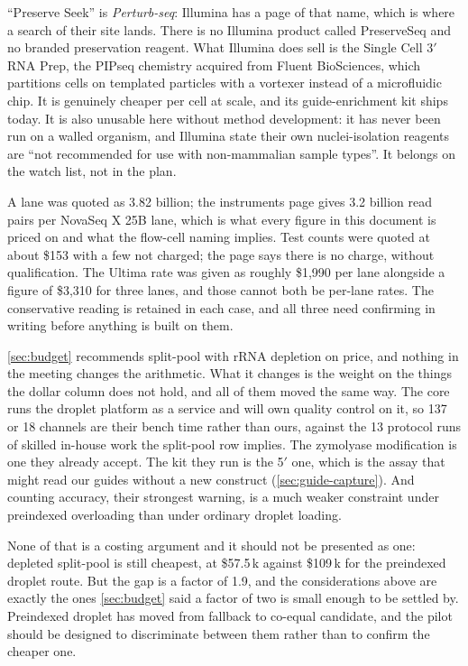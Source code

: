  ``Preserve Seek'' is
\emph{Perturb-seq}: Illumina has a page of that name, which is where a search of
their site lands. There is no Illumina product called PreserveSeq and no branded
preservation reagent. What Illumina does sell is the Single Cell 3$'$ RNA Prep,
the PIPseq chemistry acquired from Fluent BioSciences, which partitions cells on
templated particles with a vortexer instead of a microfluidic chip. It is
genuinely cheaper per cell at scale, and its guide-enrichment kit ships today.
It is also unusable here without method development: it has never been run on a
walled organism, and Illumina state their own nuclei-isolation reagents are
``not recommended for use with non-mammalian sample types''. It belongs on the watch list, not in the plan.

 A lane was
quoted as 3.82 billion; the instruments page gives 3.2 billion read pairs per
NovaSeq X 25B lane, which is what every figure in this document is priced on and
what the flow-cell naming implies. Test counts were quoted at about \$153 with a
few not charged; the page says there is no charge, without qualification. The
Ultima rate was given as roughly \$1{,}990 per lane alongside a figure of
\$3{,}310 for three lanes, and those cannot both be per-lane rates. The
conservative reading is retained in each case, and all three need confirming in
writing before anything is built on them.

 \cref{sec:budget} recommends
split-pool with rRNA depletion on price, and nothing in the meeting changes the
arithmetic. What it changes is the weight on the things the dollar column does
not hold, and all of them moved the same way. The core runs the droplet platform
as a service and will own quality control on it, so 137 or 18 channels are their
bench time rather than ours, against the 13 protocol runs of skilled in-house
work the split-pool row implies. The zymolyase modification is one they already
accept. The kit they run is the 5$'$ one, which is the assay that might read our
guides without a new construct (\cref{sec:guide-capture}). And counting accuracy,
their strongest warning, is a much weaker constraint under preindexed
overloading than under ordinary droplet loading.

None of that is a costing argument and it should not be presented as one:
depleted split-pool is still cheapest, at \$57.5\,k against \$109\,k for the
preindexed droplet route. But the gap is a factor of 1.9, and the considerations
above are exactly the ones \cref{sec:budget} said a factor of two is small enough
to be settled by. Preindexed droplet has moved from fallback to co-equal
candidate, and the pilot should be designed to discriminate between them rather
than to confirm the cheaper one.

